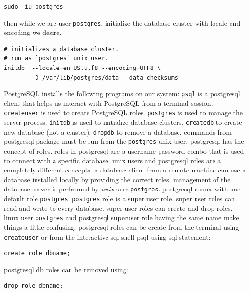 \documentclass[a4paper]{article}
\begin{document}
\begin{lstlisting}
sudo -iu postgres
\end{lstlisting}


then while we are user \lstinline{postgres}, initialize the database cluster with locale and encoding we desire.

\begin{lstlisting}
# initializes a database cluster.
# run as `postgres` unix user.
initdb  --locale=en_US.utf8 --encoding=UTF8 \
        -D /var/lib/postgres/data --data-checksums
\end{lstlisting}

PostgreSQL installs the following programs on our system: \lstinline{psql} is a postgresql client that helps us interact 
with PostgreSQL from a terminal session. \lstinline{createuser} is used to create PostgreSQL roles. \lstinline{postgres} is
used to manage the server process. \lstinline{initdb} is used to initialize database clusters. \lstinline{createdb} to create new
database (not a cluster). \lstinline{dropdb} to remove a database. commands from postgresql package must be run from the 
\lstinline{postgres} unix user. postgresql has the concept of roles. roles in postgresql are a username password combo that is
used to connect with a specific database. unix users and postgresql roles are a completely different concepts. a database client
from a remote machine can use a database installed locally by providing the correct roles. management of the database server is 
perfromed by \emph{unix} user \lstinline{postgres}. postgresql comes with one default role \lstinline{postgres}. \lstinline{postgres}
role is a super user role. super user roles can read and write to every database. super user roles can create and drop roles.
linux user \lstinline{postgres} and postgresql superuser role having the same name make things a little confusing. postgresql roles can
be create from the terminal using \lstinline{createuser} or from the interactive sql shell psql using sql statement:

\lstset{style=custom-sql}
\begin{lstlisting}
create role dbname;
\end{lstlisting}

postgresql db roles can be removed using:

\begin{lstlisting}
drop role dbname;
\end{lstlisting}

\lstset{style=custom-bash}
\end{document}
